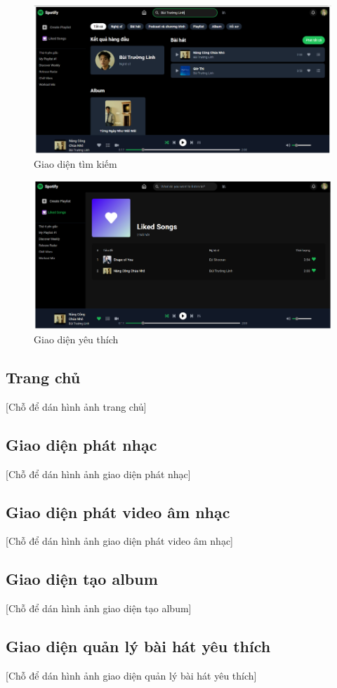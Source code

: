 \begin{figure}
    \centering
    \includegraphics[width=1\linewidth]{images/ui-search.png}
    \caption{Giao diện tìm kiếm}
    \label{fig:ui-search}
\end{figure}

\begin{figure}
    \centering
    \includegraphics[width=1\linewidth]{images/ui-favorite.png}
    \caption{Giao diện yêu thích}
    \label{fig:ui-favorite}
\end{figure}

\subsection{Trang chủ}
\label{subsec:homepage_ui}
[Chỗ để dán hình ảnh trang chủ]

\subsection{Giao diện phát nhạc}
\label{subsec:music_player_ui}
[Chỗ để dán hình ảnh giao diện phát nhạc]

\subsection{Giao diện phát video âm nhạc}
\label{subsec:video_player_ui}
[Chỗ để dán hình ảnh giao diện phát video âm nhạc]

\subsection{Giao diện tạo album}
\label{subsec:create_album_ui}
[Chỗ để dán hình ảnh giao diện tạo album]

\subsection{Giao diện quản lý bài hát yêu thích}
\label{subsec:favorite_songs_ui}
[Chỗ để dán hình ảnh giao diện quản lý bài hát yêu thích]